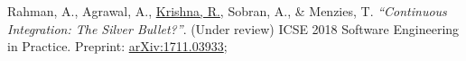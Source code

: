 \documentclass[letterpaper,9pt]{article}
\newcommand{\resumeSubHeadingListStart}{\begin{itemize}[leftmargin=*]}
\newcommand{\resumeSubHeadingListEnd}{\end{itemize}}
\begin{document}
\begin{enumerate}[label={[\arabic*]}, leftmargin=15pt]
    \item\small Rahman, A., Agrawal, A., \underline{Krishna, R.}, Sobran, A., \& Menzies, T. \textit{``Continuous Integration: The Silver Bullet?''}. (Under review) ICSE 2018 Software Engineering in Practice. Preprint: \href{https://arxiv.org/abs/1711.03933}{arXiv:1711.03933}\vspace{-6pt};
\end{enumerate}

%


\end{document}
